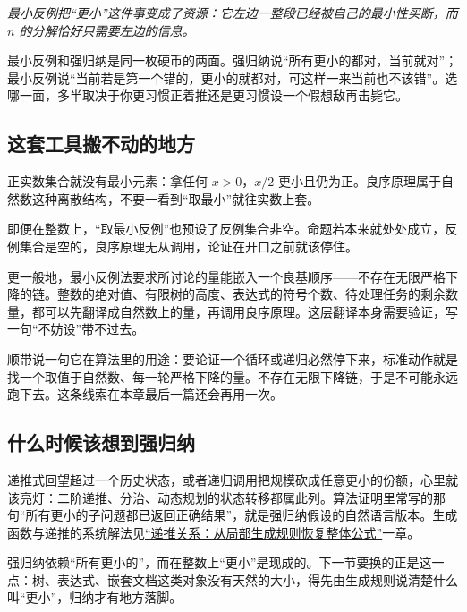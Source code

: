\begin{center}

\emph{最小反例把``更小''这件事变成了资源：它左边一整段已经被自己的最小性买断，而 \(n\) 的分解恰好只需要左边的信息。}
\end{center}

最小反例和强归纳是同一枚硬币的两面。强归纳说``所有更小的都对，当前就对''；最小反例说``当前若是第一个错的，更小的就都对，可这样一来当前也不该错''。选哪一面，多半取决于你更习惯正着推还是更习惯设一个假想敌再击毙它。

\subsection{这套工具搬不动的地方}

正实数集合就没有最小元素：拿任何 \(x>0\)，\(x/2\) 更小且仍为正。良序原理属于自然数这种离散结构，不要一看到``取最小''就往实数上套。

即便在整数上，``取最小反例''也预设了反例集合非空。命题若本来就处处成立，反例集合是空的，良序原理无从调用，论证在开口之前就该停住。

更一般地，最小反例法要求所讨论的量能嵌入一个良基顺序——不存在无限严格下降的链。整数的绝对值、有限树的高度、表达式的符号个数、待处理任务的剩余数量，都可以先翻译成自然数上的量，再调用良序原理。这层翻译本身需要验证，写一句``不妨设''带不过去。

顺带说一句它在算法里的用途：要论证一个循环或递归必然停下来，标准动作就是找一个取值于自然数、每一轮严格下降的量。不存在无限下降链，于是不可能永远跑下去。这条线索在本章最后一篇还会再用一次。

\subsection{什么时候该想到强归纳}

递推式回望超过一个历史状态，或者递归调用把规模砍成任意更小的份额，心里就该亮灯：二阶递推、分治、动态规划的状态转移都属此列。算法证明里常写的那句``所有更小的子问题都已返回正确结果''，就是强归纳假设的自然语言版本。生成函数与递推的系统解法见\hyperref[ch:027]{``递推关系：从局部生成规则恢复整体公式''}一章。

强归纳依赖``所有更小的''，而在整数上``更小''是现成的。下一节要换的正是这一点：树、表达式、嵌套文档这类对象没有天然的大小，得先由生成规则说清楚什么叫``更小''，归纳才有地方落脚。
